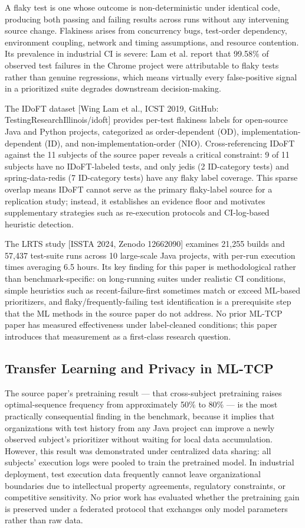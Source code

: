 \documentclass[conference]{IEEEtran}
\begin{document}
A flaky test is one whose outcome is non-deterministic under identical code, producing both passing and failing results across runs without any intervening source change. Flakiness arises from concurrency bugs, test-order dependency, environment coupling, network and timing assumptions, and resource contention. Its prevalence in industrial CI is severe: Lam et al. report that 99.58\% of observed test failures in the Chrome project were attributable to flaky tests rather than genuine regressions, which means virtually every false-positive signal in a prioritized suite degrades downstream decision-making.


The IDoFT dataset [Wing Lam et al., ICST 2019, GitHub: TestingResearchIllinois/idoft] provides per-test flakiness labels for open-source Java and Python projects, categorized as order-dependent (OD), implementation-dependent (ID), and non-implementation-order (NIO). Cross-referencing IDoFT against the 11 subjects of the source paper reveals a critical constraint: 9 of 11 subjects have no IDoFT-labeled tests, and only jedis (2 ID-category tests) and spring-data-redis (7 ID-category tests) have any flaky label coverage. This sparse overlap means IDoFT cannot serve as the primary flaky-label source for a replication study; instead, it establishes an evidence floor and motivates supplementary strategies such as re-execution protocols and CI-log-based heuristic detection.


The LRTS study [ISSTA 2024, Zenodo 12662090] examines 21,255 builds and 57,437 test-suite runs across 10 large-scale Java projects, with per-run execution times averaging 6.5 hours. Its key finding for this paper is methodological rather than benchmark-specific: on long-running suites under realistic CI conditions, simple heuristics such as recent-failure-first sometimes match or exceed ML-based prioritizers, and flaky/frequently-failing test identification is a prerequisite step that the ML methods in the source paper do not address. No prior ML-TCP paper has measured effectiveness under label-cleaned conditions; this paper introduces that measurement as a first-class research question.


\subsection{Transfer Learning and Privacy in ML-TCP}

The source paper's pretraining result — that cross-subject pretraining raises optimal-sequence frequency from approximately 50\% to 80\% — is the most practically consequential finding in the benchmark, because it implies that organizations with test history from any Java project can improve a newly observed subject's prioritizer without waiting for local data accumulation. However, this result was demonstrated under centralized data sharing: all subjects' execution logs were pooled to train the pretrained model. In industrial deployment, test execution data frequently cannot leave organizational boundaries due to intellectual property agreements, regulatory constraints, or competitive sensitivity. No prior work has evaluated whether the pretraining gain is preserved under a federated protocol that exchanges only model parameters rather than raw data.
\end{document}
